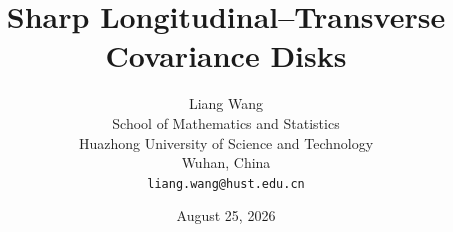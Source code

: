 \documentclass[11pt]{article}
\title{Sharp Longitudinal--Transverse Covariance Disks}
\author{Liang Wang\\
School of Mathematics and Statistics\\
Huazhong University of Science and Technology\\
Wuhan, China\\
\texttt{liang.wang@hust.edu.cn}}
\date{August 25, 2026}
\theoremstyle{remark}
\begin{document}
\maketitle

\begin{abstract}

\end{abstract}










\appendix

\end{document}
